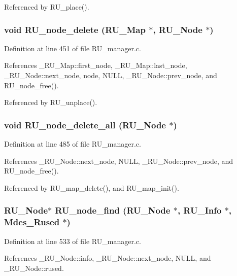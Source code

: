 Referenced by RU\_\-place().
\subsubsection{\setlength{\rightskip}{0pt plus 5cm}void RU\_\-node\_\-delete (\bf{RU\_\-Map} $\ast$, \bf{RU\_\-Node} $\ast$)}\label{RU__manager_8h_44643b97f111225d5770ad8d6af51fd9}




Definition at line 451 of file RU\_\-manager.c.

References \_\-RU\_\-Map::first\_\-node, \_\-RU\_\-Map::last\_\-node, \_\-RU\_\-Node::next\_\-node, node, NULL, \_\-RU\_\-Node::prev\_\-node, and RU\_\-node\_\-free().

Referenced by RU\_\-unplace().
\subsubsection{\setlength{\rightskip}{0pt plus 5cm}void RU\_\-node\_\-delete\_\-all (\bf{RU\_\-Node} $\ast$)}\label{RU__manager_8h_6132af9e1b1c68ce857eb75c65468d3a}




Definition at line 485 of file RU\_\-manager.c.

References \_\-RU\_\-Node::next\_\-node, NULL, \_\-RU\_\-Node::prev\_\-node, and RU\_\-node\_\-free().

Referenced by RU\_\-map\_\-delete(), and RU\_\-map\_\-init().
\subsubsection{\setlength{\rightskip}{0pt plus 5cm}\bf{RU\_\-Node}$\ast$ RU\_\-node\_\-find (\bf{RU\_\-Node} $\ast$, \bf{RU\_\-Info} $\ast$, Mdes\_\-Rused $\ast$)}\label{RU__manager_8h_907c314f12da8630b0ee860342810722}




Definition at line 533 of file RU\_\-manager.c.

References \_\-RU\_\-Node::info, \_\-RU\_\-Node::next\_\-node, NULL, and \_\-RU\_\-Node::rused.

